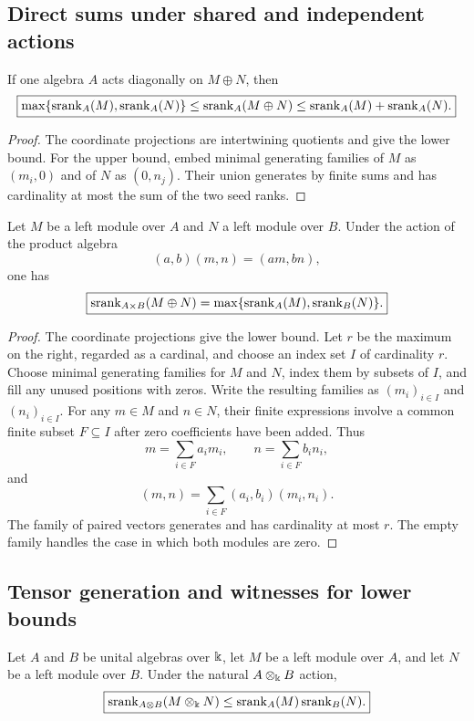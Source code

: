 \subsection{Direct sums under shared and independent actions}
\begin{proposition}
\label{prop:shared-direct-sum}
If one algebra $A$ acts diagonally on $M\oplus N$, then
\[
\boxed{
\max\{\operatorname{srank}_A(M),\operatorname{srank}_A(N)\}
\leq\operatorname{srank}_A(M\oplus N)
\leq\operatorname{srank}_A(M)+\operatorname{srank}_A(N).
}
\]
\end{proposition}

\begin{proof}
The coordinate projections are intertwining quotients and give the lower bound.  For the upper bound, embed minimal generating families of $M$ as $(m_i,0)$ and of $N$ as $(0,n_j)$. Their union generates by finite sums and has cardinality at most the sum of the two seed ranks.
\end{proof}

\begin{theorem}
\label{thm:independent-direct-sum}
Let $M$ be a left module over $A$ and $N$ a left module over $B$.  Under the action of the product algebra
\[
(a,b)(m,n)=(am,bn),
\]
one has
\[
\boxed{
\operatorname{srank}_{A\times B}(M\oplus N)
=
\max\{\operatorname{srank}_A(M),\operatorname{srank}_B(N)\}.
}
\]
\end{theorem}

\begin{proof}
The coordinate projections give the lower bound. Let $r$ be the maximum on the right, regarded as a cardinal, and choose an index set $I$ of cardinality $r$. Choose minimal generating families for $M$ and $N$, index them by subsets of $I$, and fill any unused positions with zeros. Write the resulting families as $(m_i)_{i\in I}$ and $(n_i)_{i\in I}$. For any $m\in M$ and $n\in N$, their finite expressions involve a common finite subset $F\subseteq I$ after zero coefficients have been added. Thus
\[
m=\sum_{i\in F}a_im_i,
\qquad
n=\sum_{i\in F}b_in_i,
\]
and
\[
(m,n)=\sum_{i\in F}(a_i,b_i)(m_i,n_i).
\]
The family of paired vectors generates and has cardinality at most $r$. The empty family handles the case in which both modules are zero.
\end{proof}

\subsection{Tensor generation and witnesses for lower bounds}
\begin{proposition}
\label{prop:tensor-bound}
Let $A$ and $B$ be unital algebras over $\Bbbk$, let $M$ be a left module over $A$, and let $N$ be a left module over $B$.  Under the natural $A\otimes_{\Bbbk}B$ action,
\[
\boxed{
\operatorname{srank}_{A\otimes B}(M\otimes_{\Bbbk}N)
\leq
\operatorname{srank}_A(M)\operatorname{srank}_B(N).
}
\]
\end{proposition}

